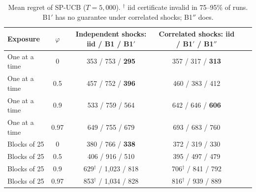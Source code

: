 \documentclass[11pt]{article}
\theoremstyle{definition}
\theoremstyle{remark}
\begin{document}
\begin{table}[t]\centering\small
{}
\caption{B2's prediction against observed violations (blocks of 25; both shock structures). With one-at-a-time exposure, iid certificates were never violated at any $\varphi$.}\label{tab:b2}
\end{table}

\begin{table}[t]\centering\small
\begin{tabular}{lccccc}
\toprule
Exposure & $\varphi$ & Independent shocks: iid / B1 / B1$'$ & Correlated shocks: iid / B1$'$ / B1$''$ \\
\midrule
One at a time & 0 & 353 / 753 / \textbf{295} & 357 / 317 / \textbf{313} \\
One at a time & 0.5 & 457 / 752 / \textbf{396} & 460 / 383 / 412 \\
One at a time & 0.9 & 533 / 759 / 564 & 642 / 646 / \textbf{606} \\
One at a time & 0.97 & 649 / 755 / 679 & 693 / 683 / 760 \\
Blocks of 25 & 0 & 380 / 766 / \textbf{338} & 372 / 319 / 330 \\
Blocks of 25 & 0.5 & 406 / 916 / 510 & 395 / 497 / 479 \\
Blocks of 25 & 0.9 & 629$^\dagger$ / 1,023 / 818 & 706$^\dagger$ / 841 / 792 \\
Blocks of 25 & 0.97 & 853$^\dagger$ / 1,034 / 828 & 816$^\dagger$ / 939 / 889 \\
\bottomrule
\end{tabular}
\caption{Mean regret of SP-UCB ($T=5{,}000$). $^\dagger$ iid certificate invalid in 75--95\% of runs. B1$'$ has no guarantee under correlated shocks; B1$''$ does.}\label{tab:b1regret}
\end{table}
\end{document}
